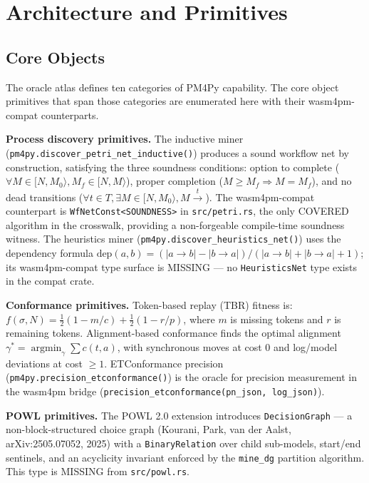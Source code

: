 
\section{Architecture and Primitives}
\label{sec:sources-pm4py-arch}

\subsection{Core Objects}
\label{sec:sources-pm4py-arch-objects}

The oracle atlas defines ten categories of PM4Py capability. The core object primitives
that span those categories are enumerated here with their wasm4pm-compat counterparts.

\textbf{Process discovery primitives.} The inductive miner (\texttt{pm4py.discover\_petri\_net\_inductive()})
produces a sound workflow net by construction, satisfying the three soundness conditions:
option to complete ($\forall M \in [N, M_0\rangle, M_f \in [N, M\rangle$), proper
completion ($M \geq M_f \Rightarrow M = M_f$), and no dead transitions ($\forall t \in T,
\exists M \in [N, M_0\rangle, M \xrightarrow{t}$). The wasm4pm-compat counterpart is
\texttt{WfNetConst<SOUNDNESS>} in \texttt{src/petri.rs}, the only COVERED algorithm in
the crosswalk, providing a non-forgeable compile-time soundness witness. The heuristics
miner (\texttt{pm4py.discover\_heuristics\_net()}) uses the dependency formula
$\text{dep}(a, b) = (|a \to b| - |b \to a|) / (|a \to b| + |b \to a| + 1)$; its
wasm4pm-compat type surface is MISSING --- no \texttt{HeuristicsNet} type exists in the
compat crate.

\textbf{Conformance primitives.} Token-based replay (TBR) fitness is:
$f(\sigma, N) = \tfrac{1}{2}(1 - m/c) + \tfrac{1}{2}(1 - r/p)$,
where $m$ is missing tokens and $r$ is remaining tokens. Alignment-based conformance
finds the optimal alignment $\gamma^* = \operatorname{argmin}_{\gamma} \sum c(t,a)$,
with synchronous moves at cost 0 and log/model deviations at cost $\geq 1$.
ETConformance precision (\texttt{pm4py.precision\_etconformance()}) is the oracle for
precision measurement in the wasm4pm bridge (\texttt{precision\_etconformance(pn\_json, log\_json)}).

\textbf{POWL primitives.} The POWL 2.0 extension introduces \texttt{DecisionGraph} ---
a non-block-structured choice graph (Kourani, Park, van der Aalst, arXiv:2505.07052, 2025)
with a \texttt{BinaryRelation} over child sub-models, start/end sentinels, and an acyclicity
invariant enforced by the \texttt{mine\_dg} partition algorithm. This type is MISSING from
\texttt{src/powl.rs}.

